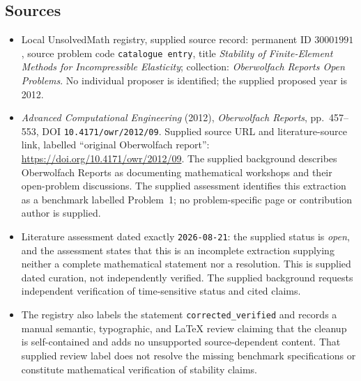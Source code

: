 \documentclass[11pt]{article}
\begin{document}
\subsection{Sources}
\begin{itemize}
\item Local UnsolvedMath registry, supplied source record: permanent ID \(30001991\), source problem code \texttt{catalogue entry}, title \emph{Stability of Finite-Element Methods for Incompressible Elasticity}; collection: \emph{Oberwolfach Reports Open Problems}. No individual proposer is identified; the supplied proposed year is 2012.
\item \emph{Advanced Computational Engineering} (2012), \emph{Oberwolfach Reports}, pp.~457--553, DOI \texttt{10.4171/owr/2012/09}. Supplied source URL and literature-source link, labelled ``original Oberwolfach report'': \url{https://doi.org/10.4171/owr/2012/09}. The supplied background describes Oberwolfach Reports as documenting mathematical workshops and their open-problem discussions. The supplied assessment identifies this extraction as a benchmark labelled Problem~1; no problem-specific page or contribution author is supplied.
\item Literature assessment dated exactly \texttt{2026-08-21}: the supplied status is \emph{open}, and the assessment states that this is an incomplete extraction supplying neither a complete mathematical statement nor a resolution. This is supplied dated curation, not independently verified. The supplied background requests independent verification of time-sensitive status and cited claims.
\item The registry also labels the statement \texttt{corrected\_verified} and records a manual semantic, typographic, and LaTeX review claiming that the cleanup is self-contained and adds no unsupported source-dependent content. That supplied review label does not resolve the missing benchmark specifications or constitute mathematical verification of stability claims.
\end{itemize}
\end{document}
